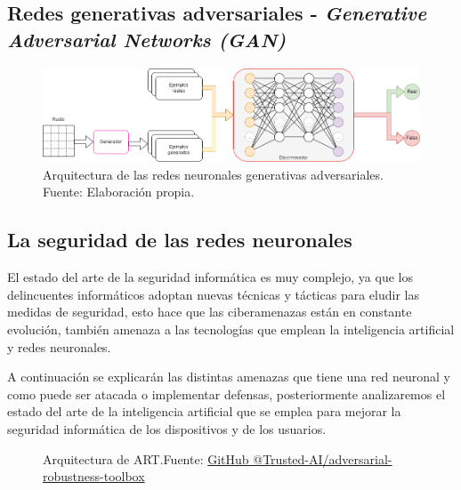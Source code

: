 \subsection{Redes generativas adversariales - \textit{Generative Adversarial Networks (GAN)}}
\begin{figure}[H]
    \centering
    \includegraphics[width=1\textwidth]{figures/chapter02/GANs.drawio.png}
    \caption{Arquitectura de las redes neuronales generativas adversariales.\\Fuente: Elaboración propia.}
    \label{fig:gans-architecture}
\end{figure}



\subsection{La seguridad de las redes neuronales}
\label{ch:2:section:state-of-the-art:computer-security-in-neural-networks}


El estado del arte de la seguridad informática es muy complejo, ya que los delincuentes informáticos adoptan nuevas técnicas y tácticas para eludir las medidas de seguridad, esto hace que las ciberamenazas están en constante evolución, también amenaza a las tecnologías que emplean la inteligencia artificial y redes neuronales.

A continuación se explicarán las distintas amenazas que tiene una red neuronal y como puede ser atacada o implementar defensas, posteriormente analizaremos el estado del arte de la inteligencia artificial que se emplea para mejorar la seguridad informática de los dispositivos y de los usuarios.

\begin{figure}[H]
    \centering
    \centerline{}
    \caption{Arquitectura de ART.\newline{}Fuente: \href{https://github.com/Trusted-AI/adversarial-robustness-toolbox/wiki/ART-Architecture-and-Roadmap}{GitHub @Trusted-AI/adversarial-robustness-toolbox}}
    \label{fig:art-architecture}
\end{figure}

